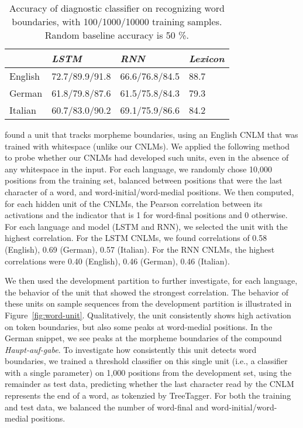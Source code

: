 \begin{table}[t]
	\small
  \begin{center}
    \begin{tabular}{l|l|l|l}
      \multicolumn{1}{c|}{}&\emph{LSTM}&\emph{RNN}&\emph{Lexicon}\\
      \hline
      English & 72.7/89.9/91.8 &  66.6/76.8/84.5  &  88.7   \\ 
      German & 61.8/79.8/87.6  &  61.5/75.8/84.3 &  79.3  \\ 
      Italian &  60.7/83.0/90.2 &  69.1/75.9/86.6  &  84.2   \\ 
    \end{tabular}
  \end{center}
  \caption{\label{tab:segmentation-results} Accuracy of diagnostic classifier on recognizing word boundaries, with 100/1000/10000 training samples. Random baseline accuracy is 50 \%.}
\end{table}



 found a unit that tracks morpheme boundaries, using an English CNLM that was trained with whitespace (unlike our CNLMs).
We applied the following method to probe whether our CNLMs had developed such units, even in the absence of any whitespace in the input.
For each language, we randomly chose 10,000 positions from the training set, balanced between positions that were the last character of a word, and word-initial/word-medial positions.
We then computed, for each hidden unit of the CNLMs, the Pearson correlation between its activations and the indicator that is 1 for word-final positions and 0 otherwise.
For each language and model (LSTM and RNN), we selected the unit with the highest correlation.
For the LSTM CNLMs, we found correlations of 0.58 (English), 0.69 (German), 0.57 (Italian).
For the RNN CNLMs, the highest correlations were 0.40 (English), 0.46 (German), 0.46 (Italian).

We then used the development partition to further investigate, for each language, the behavior of the unit that showed the strongest correlation.
The behavior of these units on sample sequences from the development partition is illustrated in Figure~\ref{fig:word-unit}.
Qualitatively, the unit consistently shows high activation on token boundaries, but also some peaks at word-medial positions.
In the German snippet, we see peaks at the morpheme boundaries of the compound \emph{Haupt-auf-gabe}.
To investigate how consistently this unit detects word boundaries, we trained a threshold classifier on this single unit (i.e., a classifier with a single parameter) on 1,000 positions from the development set, using the remainder as test data, predicting whether the last character read by the CNLM represents the end of a word, as tokenzied by TreeTagger.
For both the training and test data, we balanced the number of word-final and word-initial/word-medial positions.

